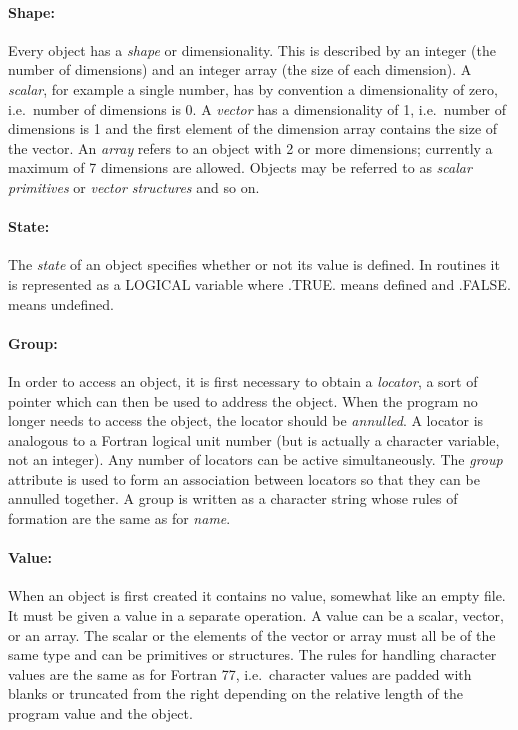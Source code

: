 \paragraph{Shape:}\hfill

Every object has a {\em shape} or dimensionality.
This is described by an integer (the number of dimensions) and an integer array
(the size of each dimension).
A {\em scalar}, for example a single number, has by convention a dimensionality
of zero, i.e.\ number of dimensions is 0.
A {\em vector} has a dimensionality of 1, i.e.\ number of dimensions is 1 and
the first element of the dimension array contains the size of the vector.
An {\em array} refers to an object with 2 or more dimensions; currently a
maximum of 7 dimensions are allowed.
Objects may be referred to as {\em scalar primitives} or
{\em vector structures} and so on.

\paragraph{State:}\hfill

The {\em state} of an object specifies whether or not its value is defined.
In routines it is represented as a LOGICAL variable where .TRUE. means defined
and .FALSE. means undefined.

\paragraph{Group:}\hfill

In order to access an object, it is first necessary to obtain a {\em locator\/},
a sort of pointer which can then be used to address the object.
When the program no longer needs to access the object, the locator should be
{\em annulled}.
A locator is analogous to a Fortran logical unit number (but is actually a
character variable, not an integer).
Any number of locators can be active simultaneously.
The {\em group} attribute is used to form an association between locators so
that they can be annulled together.
A group is written as a character string whose rules of formation are the same
as for {\em name}.

\paragraph{Value:}\hfill

When an object is first created it contains no value, somewhat like 
an empty file.
It must be given a value in a separate operation.
A value can be a scalar, vector, or an array.
The scalar or the elements of the vector or array must all be of the same
type and can be primitives or structures.
The rules for handling character values are the same as for Fortran 77, i.e.\
character values are padded with blanks or truncated from the right depending on
the relative length of the program value and the object.

